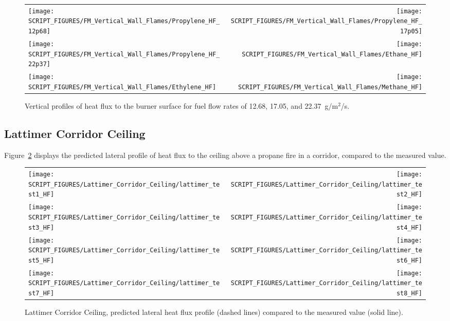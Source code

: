 \newpage

\begin{figure}[p]
\begin{tabular*}{\textwidth}{l@{\extracolsep{\fill}}r}
\texttt{[image: SCRIPT\_FIGURES/FM\_Vertical\_Wall\_Flames/Propylene\_HF\_12p68]} &
\texttt{[image: SCRIPT\_FIGURES/FM\_Vertical\_Wall\_Flames/Propylene\_HF\_17p05]} \\
\texttt{[image: SCRIPT\_FIGURES/FM\_Vertical\_Wall\_Flames/Propylene\_HF\_22p37]} &
\texttt{[image: SCRIPT\_FIGURES/FM\_Vertical\_Wall\_Flames/Ethane\_HF]} \\
\texttt{[image: SCRIPT\_FIGURES/FM\_Vertical\_Wall\_Flames/Ethylene\_HF]} &
\texttt{[image: SCRIPT\_FIGURES/FM\_Vertical\_Wall\_Flames/Methane\_HF]}
\end{tabular*}
\caption[FM Vertical Wall Flame experiments, centerline heat flux]
{Vertical profiles of heat flux to the burner surface for fuel flow rates of 12.68, 17.05, and 22.37~g/m$^2$/s.}
\label{FM_Vertical_Flame_HF}
\end{figure}

\clearpage

\subsection{Lattimer Corridor Ceiling}


Figure~\ref{Lattimer_Ceiling_Heat_Flux} displays the predicted lateral profile of heat flux to the ceiling above a propane fire in a corridor, compared to the measured value.

\begin{figure}[p]
\begin{tabular*}{\textwidth}{l@{\extracolsep{\fill}}r}
\texttt{[image: SCRIPT\_FIGURES/Lattimer\_Corridor\_Ceiling/lattimer\_test1\_HF]} &
\texttt{[image: SCRIPT\_FIGURES/Lattimer\_Corridor\_Ceiling/lattimer\_test2\_HF]} \\
\texttt{[image: SCRIPT\_FIGURES/Lattimer\_Corridor\_Ceiling/lattimer\_test3\_HF]} &
\texttt{[image: SCRIPT\_FIGURES/Lattimer\_Corridor\_Ceiling/lattimer\_test4\_HF]} \\
\texttt{[image: SCRIPT\_FIGURES/Lattimer\_Corridor\_Ceiling/lattimer\_test5\_HF]} &
\texttt{[image: SCRIPT\_FIGURES/Lattimer\_Corridor\_Ceiling/lattimer\_test6\_HF]} \\
\texttt{[image: SCRIPT\_FIGURES/Lattimer\_Corridor\_Ceiling/lattimer\_test7\_HF]} &
\texttt{[image: SCRIPT\_FIGURES/Lattimer\_Corridor\_Ceiling/lattimer\_test8\_HF]} 
\end{tabular*}
\caption[Lattimer Corridor Ceiling, heat flux to the ceiling]{Lattimer Corridor Ceiling, predicted lateral heat flux profile (dashed lines) compared to the measured value (solid line).}
\label{Lattimer_Ceiling_Heat_Flux}
\end{figure}

